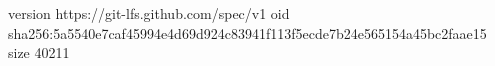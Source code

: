 version https://git-lfs.github.com/spec/v1
oid sha256:5a5540e7caf45994e4d69d924c83941f113f5ecde7b24e565154a45bc2faae15
size 40211
